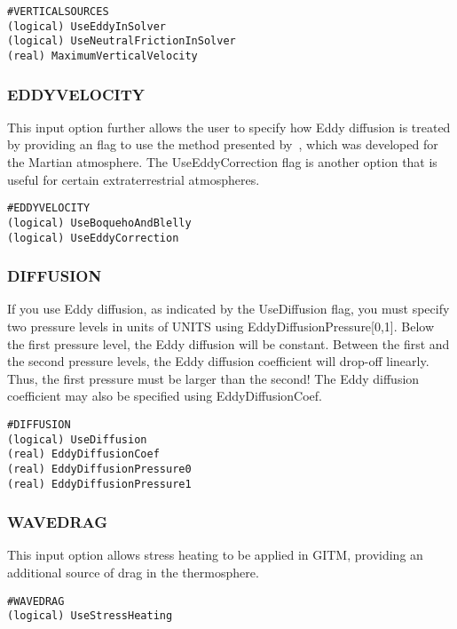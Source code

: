 \begin{verbatim}
#VERTICALSOURCES
(logical) UseEddyInSolver             
(logical) UseNeutralFrictionInSolver  
(real) MaximumVerticalVelocity    
\end{verbatim}

\subsubsection{EDDYVELOCITY}
\label{eddyvelocity.sec}

This input option further allows the user to specify how Eddy diffusion is treated by providing an flag to use the method presented by~\citet{Boqueho:2005aa}, which was developed for the Martian atmosphere.  The UseEddyCorrection flag is another option that is useful for certain extraterrestrial atmospheres.

\begin{verbatim}
#EDDYVELOCITY
(logical) UseBoquehoAndBlelly 
(logical) UseEddyCorrection
\end{verbatim}

\subsubsection{DIFFUSION}
\label{diffusion.sec}

If you use Eddy diffusion, as indicated by the UseDiffusion flag, you must specify two pressure
levels in units of UNITS using EddyDiffusionPressure[0,1].  Below the first pressure level, the Eddy diffusion will be constant.  Between the first and the second pressure levels, the Eddy diffusion coefficient will drop-off linearly.  Thus, the first pressure must be larger than the second!  The Eddy diffusion coefficient may also be specified using EddyDiffusionCoef.

\begin{verbatim}
#DIFFUSION
(logical) UseDiffusion
(real) EddyDiffusionCoef
(real) EddyDiffusionPressure0 
(real) EddyDiffusionPressure1
\end{verbatim}

\subsubsection{WAVEDRAG}
\label{wavedrag.sec}

This input option allows stress heating to be applied in GITM, providing an additional source of drag in the thermosphere.

\begin{verbatim}
#WAVEDRAG
(logical) UseStressHeating
\end{verbatim}

